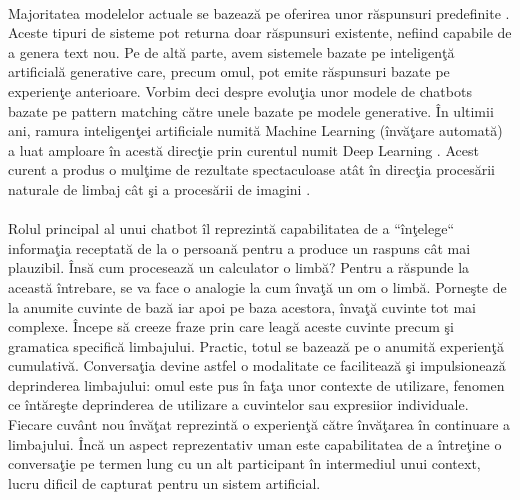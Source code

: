 \paragraph{}
Majoritatea modelelor actuale se bazeaz\u a pe oferirea unor r\u aspunsuri predefinite \cite{chatbot-models}. Aceste tipuri de sisteme pot returna doar r\u aspunsuri existente, nefiind capabile de a genera text nou. Pe de alt\u a parte, avem sistemele bazate pe inteligen\c t\u a artificial\u a generative \cite{chatbot-models} care, precum omul, pot emite r\u aspunsuri bazate pe experien\c te anterioare. Vorbim deci despre evolu\c tia unor modele de chatbots bazate pe pattern matching c\u atre unele bazate pe modele generative. \^ In ultimii ani, ramura inteligen\c tei artificiale numit\u a Machine Learning  (\^ inv\u a\c tare automat\u a) a luat amploare \^ in acest\u a direc\c tie prin curentul numit Deep Learning \cite{Goodfellow-et-al-2016}. Acest curent a produs o mul\c time de rezultate spectaculoase at\^ at \^ in direc\c tia proces\u arii naturale de limbaj c\^ at \c si a proces\u arii de imagini \cite{deep-learning-advancements}.

\paragraph{}
Rolul principal al unui chatbot \^ il reprezint\u a capabilitatea de a ``\^ in\c telege`` informa\c tia receptat\u a de la o persoan\u a pentru a produce un raspuns c\^ at mai plauzibil. \^ Ins\u a cum proceseaz\u a un calculator o limb\u a? Pentru a r\u aspunde la aceast\u a \^ intrebare, se va face o analogie la cum \^ inva\c t\u a un om o limb\u a. Porne\c ste de la anumite cuvinte de baz\u a iar apoi pe baza acestora, \^ inva\c t\u a cuvinte tot mai complexe. \^ Incepe s\u a creeze fraze prin care leag\u a aceste cuvinte precum \c si gramatica specific\u a limbajului. Practic, totul se bazeaz\u a pe o anumit\u a experien\c t\u a cumulativ\u a. Conversa\c tia devine astfel o modalitate ce faciliteaz\u a \c si impulsioneaz\u a deprinderea limbajului: omul este pus \^ in fa\c ta unor contexte de utilizare, fenomen ce \^ int\u are\c ste deprinderea de utilizare a cuvintelor sau expresiior individuale. Fiecare cuv\^ ant nou \^ inv\u a\c tat reprezint\u a o experien\c t\u a c\u atre \^ inv\u a\c tarea \^ in continuare a limbajului. \^ Inc\u a un aspect reprezentativ uman este capabilitatea de a \^ intre\c tine o conversa\c tie pe termen lung cu un alt participant \^ in intermediul unui context, lucru dificil de capturat pentru un sistem artificial.

